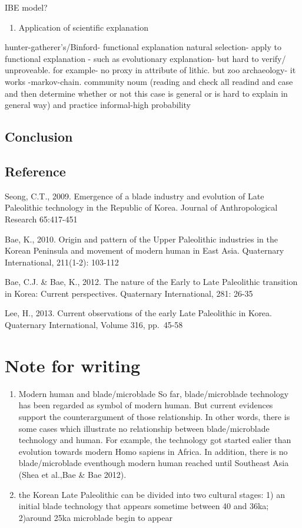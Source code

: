 \documentclass[american,man]{apa6}
\begin{document}
IBE model?

\begin{enumerate}
\def\labelenumi{\arabic{enumi})}
\setcounter{enumi}{1}
\itemsep1pt\parskip0pt
\item
  Application of scientific explanation
\end{enumerate}

hunter-gatherer's/Binford- functional explanation natural selection-
apply to functional explanation - such as evolutionary explanation- but
hard to verify/ unproveable. for example- no proxy in attribute of
lithic. but zoo archaeology- it works -markov-chain. community noum
(reading and check all readind and case and then determine whether or
not this case is general or is hard to explain in general way) and
practice informal-high probability

\subsection{Conclusion}\label{conclusion}

\subsection{Reference}\label{reference}

Seong, C.T., 2009. Emergence of a blade industry and evolution of Late
Paleolithic technology in the Republic of Korea. Journal of
Anthropological Research 65:417-451

Bae, K., 2010. Origin and pattern of the Upper Paleolithic industries in
the Korean Peninsula and movement of modern human in East Asia.
Quaternary International, 211(1-2): 103-112

Bae, C.J. \& Bae, K., 2012. The nature of the Early to Late Paleolithic
transition in Korea: Current perspectives. Quaternary International,
281: 26-35

Lee, H., 2013. Current observations of the early Late Paleolithic in
Korea. Quaternary International, Volume 316, pp.~45-58

\section{Note for writing}\label{note-for-writing}

\begin{enumerate}
\def\labelenumi{(\arabic{enumi})}
\item
  Modern human and blade/microblade So far, blade/microblade technology
  has been regarded as symbol of modern human. But current evidences
  support the counterargument of those relationship. In other words,
  there is some cases which illustrate no relationship between
  blade/microblade technology and human. For example, the technology got
  started ealier than evolution towards modern Homo sapiens in Africa.
  In addition, there is no blade/microblade eventhough modern human
  reached until Southeast Asia (Shea et al.,Bae \& Bae 2012).
\item
  the Korean Late Paleolithic can be divided into two cultural stages:
  1) an initial blade technology that appears sometime between 40 and
  36ka; 2)around 25ka microblade begin to appear
\end{enumerate}
\end{document}
